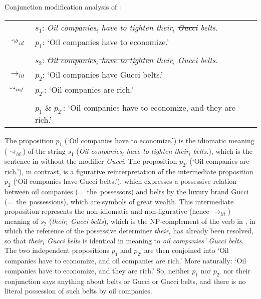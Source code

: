 \documentclass[output=paper]{langsci/langscibook}
\begin{document}
\ea \label{analysis Gucci belts -- simple} 
Conjunction modification analysis of : \\
\vspace{5pt}
\begin{tabular}{ll}
								& 	$s_{1}$: \hspace{4pt} \textit{Oil companies$_{i}$ have to tighten their$_{i}$ \sout{Gucci} belts.} \\
$\rightsquigarrow_{id}$				&	$p_{1}$: \hspace{1pt} `Oil companies have to economize.' \\
\vspace{-5pt} \\
								&	$s_{2}$: \hspace{4pt} \textit{\sout{Oil companies$_{i}$ have to tighten} their$_{i}$ Gucci belts.} \\
$\rightarrow_{lit}$					&	$p_{2}$: \hspace{1pt} `Oil companies have Gucci belts.' \\
$\rightsquigarrow_{in\hspace{-0.8pt} f}$	&	$p_{2'}$: \hspace{-1.5pt} `Oil companies are rich.' \\
\vspace{-5pt} \\
								&	$p_{1}$ \& $p_{2'}$: `Oil companies have to economize, and they are rich.'
\end{tabular}
\z

\noindent The proposition $p_{1}$ (`Oil companies have to economize.') is the idiomatic meaning ($\rightsquigarrow_{id}$) of the string $s_{1}$ (\textit{Oil companies$_{i}$ have to tighten their$_{i}$ belts.}), which is the sentence in  without the modifier \textit{Gucci}. The proposition $p_{2'}$ (`Oil companies are rich.'), in contrast, is a figurative reinterpretation of the intermediate proposition $p_{2}$ (`Oil companies have Gucci belts.'), which expresses a possessive relation between oil companies \mbox{(= the possessors)} and belts by the luxury brand Gucci \mbox{(= the possessions)}, which are symbols of great wealth. This intermediate proposition represents the non-idiomatic and non-figurative (hence $\rightarrow_{lit}$) meaning of $s_{2}$ (\textit{their$_{i}$ Gucci belts}), which is the NP-complement of the verb in , in which the reference of the possessive determiner \textit{their$_{i}$} has already been resolved, so that \textit{their$_{i}$ Gucci belts} is identical in meaning to \textit{oil companies' Gucci belts}. The two independent propositions $p_{1}$ and $p_{2'}$ are then conjoined into `Oil companies have to economize, and oil companies are rich.' More naturally: `Oil companies have to economize, and they are rich.' So, neither $p_{1}$ nor $p_{2'}$ nor their conjunction says anything about belts or Gucci or Gucci belts, and there is no literal possession of such belts by oil companies.
\end{document}
